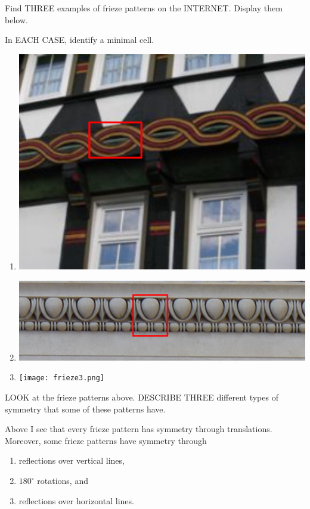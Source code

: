 \documentclass[noauthor,nooutcomes,hints,handout]{ximera}
\begin{document}
\begin{question}
  Find THREE examples of frieze patterns on the INTERNET.
  Display them below.

  In EACH CASE, identify a minimal cell.
  \begin{freeResponse}
    \begin{enumerate}
    \item \begin{center}
      \includegraphics[width=.6\textwidth]{frieze1.png}
    \end{center}
    \item
      \begin{center}
      \includegraphics[width=.6\textwidth]{frieze2.png}
      \end{center}
    \item
      \begin{center}
        \texttt{[image: frieze3.png]}
      \end{center}
    \end{enumerate}
  \end{freeResponse}
\end{question}
\mynewpage



\begin{question}
  LOOK at the frieze patterns above. DESCRIBE THREE different types of
  symmetry that some of these patterns have.
  \begin{freeResponse}
    Above I see that every frieze pattern has symmetry through
    translations.  Moreover, some frieze patterns have symmetry
    through
    \begin{enumerate}
    \item reflections over vertical lines,
    \item $180^\circ$ rotations, and
    \item reflections over horizontal
      lines.
    \end{enumerate}
  \end{freeResponse}
\end{question}
\end{document}
